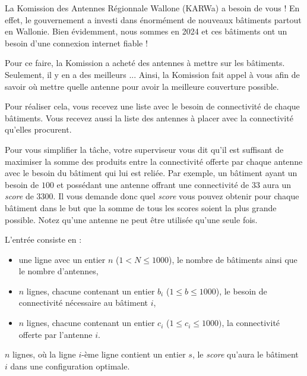 \problemname{\problemyamlname}


La Komission des Antennes Régionnale Wallone (KARWa) a besoin de vous ! En effet, le gouvernement a investi dans énormément de nouveaux bâtiments partout en Wallonie. Bien évidemment, nous sommes en 2024 et ces bâtiments ont un besoin d'une connexion internet fiable !

Pour ce faire, la Komission a acheté des antennes à mettre sur les bâtiments. Seulement, il y en a des meilleurs ... Ainsi, la Komission fait appel à vous afin de savoir où mettre quelle antenne pour avoir la meilleure couverture possible.

Pour réaliser cela, vous recevez une liste avec le besoin de connectivité de chaque bâtiments. Vous recevez aussi la liste des antennes à placer avec la connectivité qu'elles procurent.

Pour vous simplifier la tâche, votre superviseur vous dit qu'il est suffisant de maximiser la somme des produits entre la connectivité offerte par chaque antenne avec le besoin du bâtiment qui lui est reliée. Par exemple, un bâtiment ayant un besoin de $100$ et possédant une antenne offrant une connectivité de $33$ aura un \emph{score} de $3300$. Il vous demande donc quel \emph{score} vous pouvez obtenir pour chaque bâtiment dans le but que la somme de tous les scores soient la plus grande possible. Notez qu'une antenne ne peut être utilisée qu'une seule fois.

\begin{Input}
    L'entrée consiste en :
    \begin{itemize}
      \item une ligne avec un entier $n$ ($1 < N \leq 1000$), le nombre de bâtiments ainsi que le nombre d'antennes,
      \item $n$ lignes, chacune contenant un entier $b_i$ ($1 \leq b \leq 1000$), le besoin de connectivité nécessaire au bâtiment $i$,
      \item $n$ lignes, chacune contenant un entier $c_i$ ($1 \leq c_i \leq 1000)$, la connectivité offerte par l'antenne $i$.
    \end{itemize}
\end{Input}

\begin{Output}
  $n$ lignes, où la ligne $i$-ème ligne contient un entier $s$, le \emph{score} qu'aura le bâtiment $i$ dans une configuration optimale.
\end{Output}
